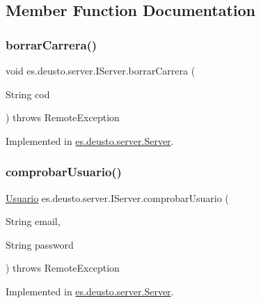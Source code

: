 \subsection{Member Function Documentation}
\mbox{\label{interfacees_1_1deusto_1_1server_1_1_i_server_aaf52191bb3f870f0fcbdd58ffa7bd9c7}} 
\subsubsection{\texorpdfstring{borrarCarrera()}{borrarCarrera()}}
{\footnotesize\ttfamily void es.\+deusto.\+server.\+I\+Server.\+borrar\+Carrera (\begin{DoxyParamCaption}\item[{String}]{cod }\end{DoxyParamCaption}) throws Remote\+Exception}



Implemented in \mbox{\hyperlink{classes_1_1deusto_1_1server_1_1_server_a0a3160bdb7bfaab43143f1b0e68aee51}{es.\+deusto.\+server.\+Server}}.

\mbox{\label{interfacees_1_1deusto_1_1server_1_1_i_server_a864d05d99ec3891208c39d8352221656}} 
\subsubsection{\texorpdfstring{comprobarUsuario()}{comprobarUsuario()}}
{\footnotesize\ttfamily \mbox{\hyperlink{classes_1_1deusto_1_1server_1_1jdo_1_1_usuario}{Usuario}} es.\+deusto.\+server.\+I\+Server.\+comprobar\+Usuario (\begin{DoxyParamCaption}\item[{String}]{email,  }\item[{String}]{password }\end{DoxyParamCaption}) throws Remote\+Exception}



Implemented in \mbox{\hyperlink{classes_1_1deusto_1_1server_1_1_server_afa3e758715cbf321f9c1cbe08a8583a4}{es.\+deusto.\+server.\+Server}}.

